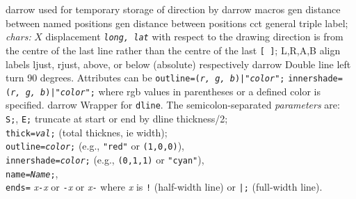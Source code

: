 %
  {darrow}%
  {used for temporary storage of direction by darrow macros}%
%
  {gen}%
  {distance between named positions}%
%
  {gen}%
  {distance between positions}%
%
  {cct}%
  {general triple label; {\sl chars:}%
    $X$ displacement {\tt {\sl long, lat}} with respect to the drawing
      direction is from the centre of the last
      line rather than the centre of the last {\tt [ ]};
    L,R,A,B align labels ljust, rjust, above,
      or below (absolute) respectively  }%
%
  {darrow}%
  {Double line left turn 90 degrees.  Attributes can be
    {\tt outline=({\sl r, g, b})|"{\sl color}";}%
    {\tt innershade=({\sl r, g, b})|"{\sl color}";}%
    where rgb values in parentheses or a defined color is specified.}%
%
  {darrow}%
  {Wrapper for {\tt dline}.
  The semicolon-separated {\sl parameters} are:\\
    {\tt S;}, {\tt E;} truncate at start or end by dline thickness/2;\\
    {\tt thick={\sl val};}   (total thicknes, ie width);\\
    {\tt outline={\sl color};} (e.g., {\tt "red"} or {\tt (1,0,0)}),\\
    {\tt innershade={\sl color};} (e.g., {\tt (0,1,1)} or {\tt "cyan"}),\\
    {\tt name={\sl Name};},\\
    {\tt ends=}%
      {\sl x}{\tt -}{\sl x} or
      {\tt -}{\sl x} or
      {\sl x}{\tt -} where {\sl x} is {\tt !} (half-width line)
       or {\tt |;} (full-width line).}%
%
